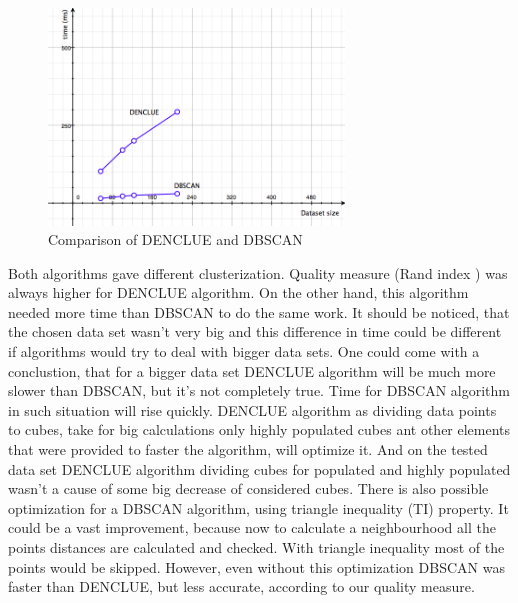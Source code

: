 \documentclass[12pt, a4paper, notitlepage, oneside]{article}
\begin{document}
\begin{figure}[!ht]
 	\centering
	\includegraphics[width=0.7\textwidth]{images/comparison_time.png}
 	\caption[]
	{Comparison of DENCLUE and DBSCAN}
		\label{comparison_time}
\end{figure}

Both algorithms gave different clusterization.
Quality measure (Rand index \cite{rand}) was always higher for DENCLUE algorithm.
On the other hand, this algorithm needed more time than DBSCAN to do the same work. 
It should be noticed, that the chosen data set wasn't very big and this difference in time could be different if 
algorithms would try to deal with bigger data sets. 
One could come with a conclustion, that for a bigger data set DENCLUE algorithm will be much more slower 
than DBSCAN, but it's not completely true. 
Time for DBSCAN algorithm in such situation will rise quickly. 
DENCLUE algorithm as dividing data points to cubes, take for big calculations only highly populated cubes ant other 
elements that were provided to faster the algorithm, will optimize it. 
And on the tested data set DENCLUE algorithm dividing cubes for populated and 
highly populated wasn't a cause of some big decrease of considered cubes. 
There is also possible optimization for a DBSCAN algorithm, using triangle inequality (TI) property. \cite{mkr}
It could be a vast improvement, because now to calculate a neighbourhood all the points distances are calculated and checked.
With triangle inequality most of the points would be skipped. However, even without this optimization DBSCAN was faster
than DENCLUE, but less accurate, according to our quality measure.

\newpage



\end{document}

